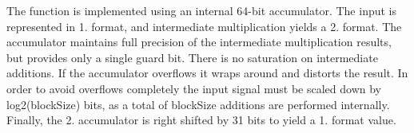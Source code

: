 \begin{DoxyParagraph}{}
The function is implemented using an internal 64-\/bit accumulator. The input is represented in 1. format, and intermediate multiplication yields a 2. format. The accumulator maintains full precision of the intermediate multiplication results, but provides only a single guard bit. There is no saturation on intermediate additions. If the accumulator overflows it wraps around and distorts the result. In order to avoid overflows completely the input signal must be scaled down by log2(block\-Size) bits, as a total of block\-Size additions are performed internally. Finally, the 2. accumulator is right shifted by 31 bits to yield a 1. format value. 
\end{DoxyParagraph}
